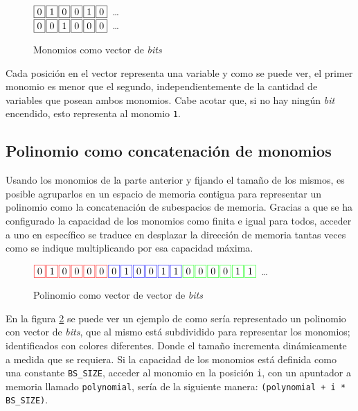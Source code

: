 \begin{figure}
    \centering\noindent
    $\fbox{0} \hspace*{.1em} \fbox{1} \hspace*{.1em} \fbox{0} \hspace*{.1em} \fbox{0} \hspace*{.1em} \fbox{1} \hspace*{.1em} \fbox{0}$\ \dots\ \\
    \noindent
    $\fbox{0} \hspace*{.1em} \fbox{0} \hspace*{.1em} \fbox{1} \hspace*{.1em} \fbox{0} \hspace*{.1em} \fbox{0} \hspace*{.1em} \fbox{0}$\ \dots\
\caption{Monomios como vector de \textit{bits}}
\label{fig:mbs}
\end{figure}

Cada posición en el vector representa una variable y como se puede ver, el primer monomio es menor que el segundo, independientemente de la cantidad de variables que posean ambos monomios. Cabe acotar que, si no hay ningún \textit{bit} encendido, esto representa al monomio \texttt{1}.

\subsection{Polinomio como concatenación de monomios}

Usando los monomios de la parte anterior y fijando el tamaño de los mismos, es posible agruparlos en un espacio de memoria contigua para representar un polinomio como la concatenación de subespacios de memoria. Gracias a que se ha configurado la capacidad de los monomios como finita e igual para todos, acceder a uno en específico se traduce en desplazar la dirección de memoria tantas veces como se indique multiplicando por esa capacidad máxima.

\begin{figure}
    \centering\noindent
    $\fcolorbox{red}{white}{0} \sep \fcolorbox{red}{white}{1} \sep \fcolorbox{red}{white}{0} \sep \fcolorbox{red}{white}{0} \sep \fcolorbox{red}{white}{0} \sep \fcolorbox{red}{white}{0} \sep \fcolorbox{blue}{white}{0} \sep \fcolorbox{blue}{white}{1} \sep \fcolorbox{blue}{white}{0} \sep \fcolorbox{blue}{white}{0} \sep \fcolorbox{blue}{white}{1} \sep \fcolorbox{blue}{white}{1} \sep \fcolorbox{green}{white}{0} \sep \fcolorbox{green}{white}{0} \sep \fcolorbox{green}{white}{0} \sep \fcolorbox{green}{white}{0} \sep \fcolorbox{green}{white}{1} \sep \fcolorbox{green}{white}{1}$\ \dots\ \\
\caption{Polinomio como vector de vector de \textit{bits}}
\label{fig:pbs}
\end{figure}

En la figura \ref{fig:pbs} se puede ver un ejemplo de como sería representado un polinomio con vector de \textit{bits}, que al mismo está subdividido para representar los monomios; identificados con colores diferentes. Donde el tamaño incrementa dinámicamente a medida que se requiera. Si la capacidad de los monomios está definida como una constante \texttt{BS\_SIZE}, acceder al monomio en la posición \texttt{i}, con un apuntador a memoria llamado \texttt{polynomial}, sería de la siguiente manera: \texttt{(polynomial + i * BS\_SIZE)}.


